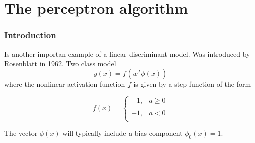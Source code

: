 \section{The perceptron algorithm }


\begin{frame}
    \frametitle{Introduction }

    Is another importan example of a linear discriminant model. 
    Was introduced by Rosenblatt in 1962. 
    Two class model 
    \begin{equation}
        y(x)
        = 
        f(w^T \phi(x))
    \end{equation}
    where the nonlinear activation function $f$ is given by a 
    step function of the form 

    \begin{equation}
        f(x)= \left\{ \begin{array}{lcc}
            +1,  & a \geq 0 \\
            \\ -1, & a < 0  \\
            \end{array}
  \right.
    \end{equation}

    The vector $\phi(x)$ will typically include a bias component
    $\phi_0(x) = 1$. 

\end{frame}